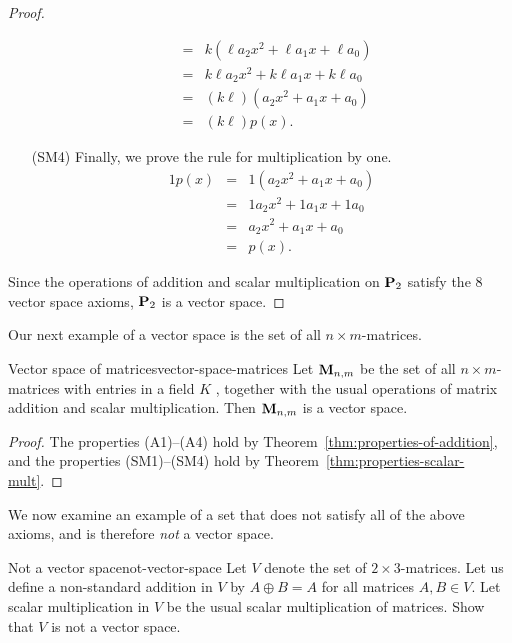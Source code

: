 \begin{proof}
\begin{itemize}
\begin{eqnarray*}
               &=& k(\ell a_2x^2 + \ell a_1x + \ell a_0)\\
               &=&  k\ell a_2x^2 + k\ell a_1x + k\ell a_0 \\
               &=& (k\ell) (a_2x^2 + a_1x + a_0)\\
               &=& (k\ell) p(x).
    \end{eqnarray*}
  \item[(SM4)] Finally, we prove the rule for multiplication by one.
    \begin{eqnarray*}
      1p(x) &=& 1 (a_2x^2 + a_1x + a_0)\\
            &=& 1a_2x^2 + 1a_1x + 1a_0\\
            &=& a_2x^2 + a_1x + a_0\\
            &=& p(x).
    \end{eqnarray*}
  \end{itemize}
  Since the operations of addition and scalar multiplication on
  $\mathbf{P}_2$ satisfy the $8$ vector space axioms, $\mathbf{P}_2$ is a vector
  space.
\end{proof}

Our next example of a vector space is the set of all
$n\times m$-matrices.

\begin{example}{Vector space of matrices}{vector-space-matrices}
  Let $\mathbf{M}_{n,m}$%
   be the set of all $n\times m$-matrices
  with entries in a field $K$%
  , together with the usual operations
  of matrix addition and scalar multiplication. Then $\mathbf{M}_{n,m}$ is a
  vector space.
\end{example}

\begin{proof}
  The properties (A1)--(A4) hold by
  Theorem~\ref{thm:properties-of-addition}, and the properties
  (SM1)--(SM4) hold by Theorem~\ref{thm:properties-scalar-mult}.
\end{proof}

We now examine an example of a set that does not satisfy all of the
above axioms, and is therefore \textit{not} a vector space.

\begin{example}{Not a vector space}{not-vector-space}
  Let $V$ denote the set of $2 \times 3$-matrices. Let us define a
  non-standard addition in $V$ by $A \oplus B = A$ for all matrices
  $A,B\in V$. Let scalar multiplication in $V$ be the usual scalar
  multiplication of matrices. Show that $V$ is not a vector space.
\end{example}

